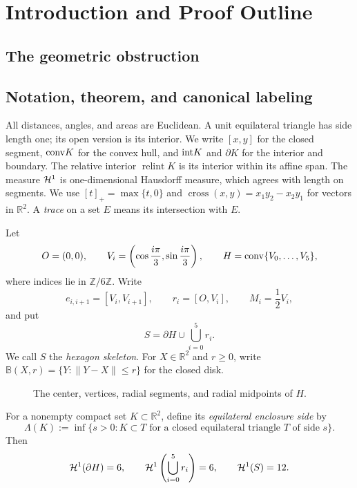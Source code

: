 \section{Introduction and Proof Outline}
\label{sec:introduction}

\subsection{The geometric obstruction}



\subsection{Notation, theorem, and canonical labeling}

All distances, angles, and areas are Euclidean. A unit equilateral triangle
has side length one; its open version is its interior. We write $[x,y]$
for the closed segment, $\mathrm{conv} K$ for the convex hull, and $\mathrm{int} K$
and $\partial K$ for the interior and boundary. The relative interior
$\operatorname{relint}K$ is its interior within its affine span. The measure $\mathcal H^1$ is
one-dimensional Hausdorff measure, which agrees with length on segments.
We use $[t]_+=\max\{t,0\}$ and
$\operatorname{cross}(x,y)=x_1y_2-x_2y_1$ for vectors in $\mathbb R^2$.
A \emph{trace} on a set $E$ means its intersection with $E$.

Let
\[
 O=(0,0),\qquad
 V_i=\left(\cos\frac{i\pi}{3},\sin\frac{i\pi}{3}\right),\qquad
 H=\mathrm{conv}\{V_0,\ldots,V_5\},
\]
where indices lie in $\mathbb Z/6\mathbb Z$.  Write
\[
 e_{i,i+1}=[V_i,V_{i+1}],\qquad r_i=[O,V_i],\qquad M_i=\frac12V_i,
\]
and put
\[
 S=\partial H\cup\bigcup_{i=0}^5r_i.
\]
We call $S$ the \emph{hexagon skeleton}. For $X\in\mathbb R^2$ and $r\ge0$,
write $\mathbb B(X,r)=\{Y:\|Y-X\|\le r\}$ for the closed disk.
\begin{figure}[H]
\centering

\caption{The center, vertices, radial segments, and radial midpoints of $H$.}
\label{fig:geometry-roles}
\end{figure}

For a nonempty compact set $K\subset\mathbb R^2$, define its
\emph{equilateral enclosure side} by
\begin{equation}
 \Lambda(K):=\inf\{s>0:K\subset T\text{ for a closed equilateral
 triangle }T\text{ of side }s\}.
 \label{eq:enclosure-definition}
\end{equation}
Then
\begin{equation}
 \mathcal H^1(\partial H)=6,\qquad
 \mathcal H^1\left(\bigcup_{i=0}^5r_i\right)=6,\qquad \mathcal H^1(S)=12.
\label{eq:target-lengths}
\end{equation}

